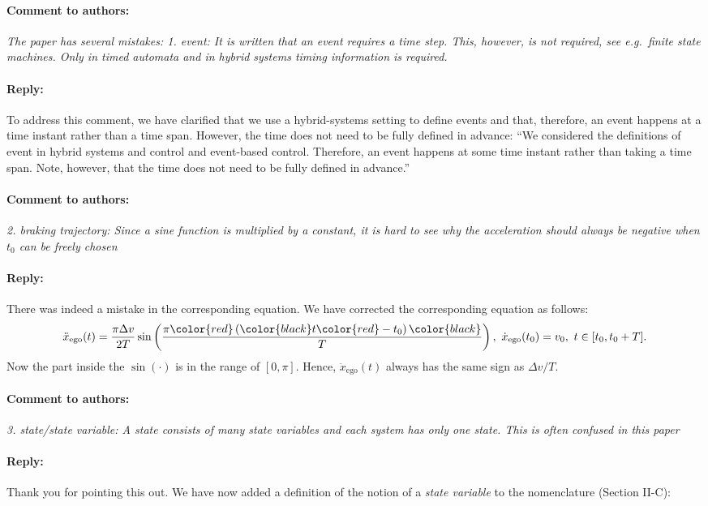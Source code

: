 \documentclass[10pt,final,a4paper,oneside,onecolumn]{article}
\newcommand{\toauthor}{\paragraph*{Comment to authors:} \itshape}
\newcommand{\fromauthor}{\paragraph*{Reply:} \normalfont}
\newcommand{\cstart}{\cbstart\color{red}}
\newcommand{\cend}{\cbend\color{black}}
\newcommand{\amplitude}{\Delta v}
\newcommand{\duration}{T}
\newcommand{\east}{x}
\newcommand{\egosub}{ego}
\newcommand{\egospeed}{\dot{\east}_{\mathrm{\egosub}}}
\newcommand{\egospeedinitsymbol}{v}
\newcommand{\egospeedinit}{\egospeedinitsymbol_{0}}
\newcommand{\egoacceleration}{\ddot{\east}_{\mathrm{\egosub}}}
\renewcommand{\time}{t}
\newcommand{\inittime}{\time_{0}}
\begin{document}
\toauthor The paper has several mistakes: 1. event: It is written that an event requires a time step. This, however, is not required, see e.g.\ finite state machines. Only in timed automata and in hybrid systems timing information is required.

\fromauthor To address this comment, we have clarified that we use a hybrid-systems setting to define events and that, therefore, an event happens at a time instant rather than a time span. However, the time does not need to be fully defined in advance: ``\cstart We considered the definitions of event in hybrid systems and control and event-based control. Therefore, an event happens at some time instant rather than taking a time span. Note, however, that the time does not need to be fully defined in advance.\cend''




\toauthor 2. braking trajectory: Since a sine function is multiplied by a constant, it is hard to see why the acceleration should always be negative when $t_0$ can be freely chosen

\fromauthor There was indeed a mistake in the corresponding equation. We have corrected the corresponding equation as follows:
\begin{equation}
\egoacceleration(\time) = \frac{\pi \amplitude}{2\duration} \sin \left( \frac{\pi \color{red}\left(\color{black} \time \color{red} - \inittime\right)\color{black}}{\duration} \right),\ \egospeed(\inittime) = \egospeedinit,\ \time \in [\inittime, \inittime+\duration].
\end{equation}
Now the part inside the $\sin(\cdot)$ is in the range of $[0, \pi]$. Hence, $\egoacceleration(\time)$ always has the same sign as $\amplitude/\duration$.



\toauthor 3. state/state variable: A state consists of many state variables and each system has only one state. This is often confused in this paper

\fromauthor Thank you for pointing this out. We have now added a definition of the notion of a \emph{state variable} to the nomenclature (Section II-C):
\end{document}

